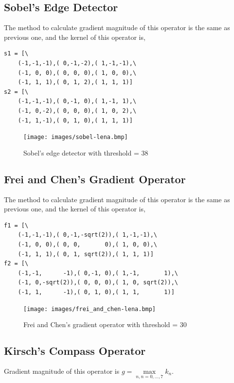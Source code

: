 \documentclass[14pt,a4paper]{extarticle}
\begin{document}
\subsection{Sobel's Edge Detector}

The method to calculate gradient magnitude of this operator is the same as previous one, and the kernel of this operator is,
\begin{lstlisting}
s1 = [\
	(-1,-1,-1),( 0,-1,-2),( 1,-1,-1),\
	(-1, 0, 0),( 0, 0, 0),( 1, 0, 0),\
	(-1, 1, 1),( 0, 1, 2),( 1, 1, 1)]
s2 = [\
	(-1,-1,-1),( 0,-1, 0),( 1,-1, 1),\
	(-1, 0,-2),( 0, 0, 0),( 1, 0, 2),\
	(-1, 1,-1),( 0, 1, 0),( 1, 1, 1)]
\end{lstlisting}

\begin{figure}[H]
\centering
\texttt{[image: images/sobel-lena.bmp]}
\caption{Sobel's edge detector with threshold = 38}
\end{figure}

\subsection{Frei and Chen's Gradient Operator}

The method to calculate gradient magnitude of this operator is the same as previous one, and the kernel of this operator is,
\begin{lstlisting}
f1 = [\
	(-1,-1,-1),( 0,-1,-sqrt(2)),( 1,-1,-1),\
	(-1, 0, 0),( 0, 0,       0),( 1, 0, 0),\
	(-1, 1, 1),( 0, 1, sqrt(2)),( 1, 1, 1)]
f2 = [\
	(-1,-1,      -1),( 0,-1, 0),( 1,-1,       1),\
	(-1, 0,-sqrt(2)),( 0, 0, 0),( 1, 0, sqrt(2)),\
	(-1, 1,      -1),( 0, 1, 0),( 1, 1,       1)]
\end{lstlisting}

\begin{figure}[H]
\centering
\texttt{[image: images/frei\_and\_chen-lena.bmp]}
\caption{Frei and Chen's gradient operator with threshold = 30}
\end{figure}

\subsection{Kirsch's Compass Operator}

Gradient magnitude of this operator is $g = \underset{n,n=0,\dots,7}{\max}k_n$.
\end{document}
